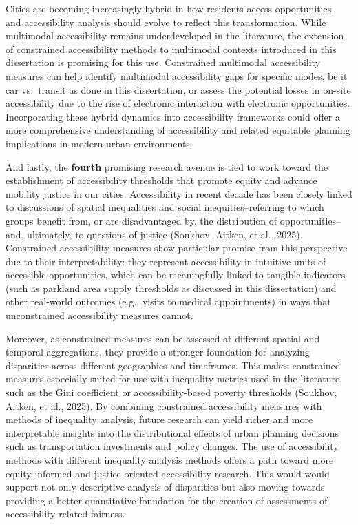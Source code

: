 \documentclass[
11pt, %
oneside, %
english, %
singlespacing, %
]{macthesis} %
\begin{document}
Cities are becoming increasingly hybrid in how residents access opportunities, and accessibility analysis should evolve to reflect this transformation. While multimodal accessibility remains underdeveloped in the literature, the extension of constrained accessibility methods to multimodal contexts introduced in this dissertation is promising for this use. Constrained multimodal accessibility measures can help identify multimodal accessibility gaps for specific modes, be it car vs.~transit as done in this dissertation, or assess the potential losses in on-site accessibility due to the rise of electronic interaction with electronic opportunities. Incorporating these hybrid dynamics into accessibility frameworks could offer a more comprehensive understanding of accessibility and related equitable planning implications in modern urban environments.

And lastly, the \textbf{fourth} promising research avenue is tied to work toward the establishment of accessibility thresholds that promote equity and advance mobility justice in our cities. Accessibility in recent decade has been closely linked to discussions of spatial inequalities and social inequities--referring to which groups benefit from, or are disadvantaged by, the distribution of opportunities--and, ultimately, to questions of justice (Soukhov, Aitken, et al., 2025). Constrained accessibility measures show particular promise from this perspective due to their interpretability: they represent accessibility in intuitive units of accessible opportunities, which can be meaningfully linked to tangible indicators (such as parkland area supply thresholds as discussed in this dissertation) and other real-world outcomes (e.g., visits to medical appointments) in ways that unconstrained accessibility measures cannot.

Moreover, as constrained measures can be assessed at different spatial and temporal aggregations, they provide a stronger foundation for analyzing disparities across different geographies and timeframes. This makes constrained measures especially suited for use with inequality metrics used in the literature, such as the Gini coefficient or accessibility-based poverty thresholds (Soukhov, Aitken, et al., 2025). By combining constrained accessibility measures with methods of inequality analysis, future research can yield richer and more interpretable insights into the distributional effects of urban planning decisions such as transportation investments and policy changes. The use of accessibility methods with different inequality analysis methods offers a path toward more equity-informed and justice-oriented accessibility research. This would would support not only descriptive analysis of disparities but also moving towards providing a better quantitative foundation for the creation of assessments of accessibility-related fairness.
\end{document}
